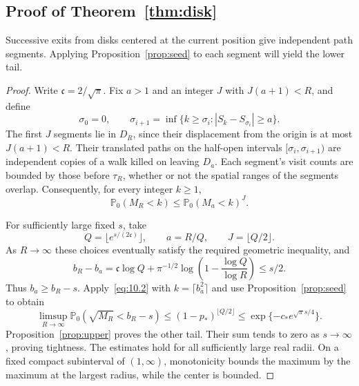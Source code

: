 \documentclass[11pt,a4paper]{article}
\numberwithin{equation}{section}
\theoremstyle{remark}
\begin{document}
\subsection{Proof of Theorem~\ref{thm:disk}}
Successive exits from disks centered at the current position give independent path segments. Applying Proposition~\ref{prop:seed} to each segment will yield the lower tail.
\begin{proof}
Write $\mathfrak c=2/\sqrt\pi$. Fix $a>1$ and an integer $J$ with $J(a+1)<R$, and define
\begin{equation}\label{eq:10.1}
\sigma_0=0,\qquad
\sigma_{i+1}=\inf\{k\ge\sigma_i:|S_k-S_{\sigma_i}|\ge a\}.
\end{equation}
The first $J$ segments lie in $D_R$, since their displacement from the origin is at most $J(a+1)<R$. Their translated paths on the half-open intervals $[\sigma_i,\sigma_{i+1})$ are independent copies of a walk killed on leaving $D_a$. Each segment's visit counts are bounded by those before $\tau_R$, whether or not the spatial ranges of the segments overlap. Consequently, for every integer $k\ge1$,
\begin{equation}\label{eq:10.2}
\mathbb P_0(M_R<k)\le\mathbb P_0(M_a<k)^J.
\end{equation}

For sufficiently large fixed $s$, take
\begin{equation}\label{eq:10.3}
Q=\lfloor e^{s/(2\mathfrak c)}\rfloor,\qquad
a=R/Q,\qquad J=\lfloor Q/2\rfloor.
\end{equation}
As $R\to\infty$ these choices eventually satisfy the required geometric inequality, and
\begin{equation}\label{eq:10.4}
b_R-b_a=\mathfrak c\log Q+
\pi^{-1/2}\log\left(1-\frac{\log Q}{\log R}\right)\le s/2.
\end{equation}
Thus $b_a\ge b_R-s$. Apply~\eqref{eq:10.2} with $k=\lceil b_a^2\rceil$ and use Proposition~\ref{prop:seed} to obtain
\begin{equation}\label{eq:10.5}
\limsup_{R\to\infty}\mathbb P_0(\sqrt{M_R}<b_R-s)
\le(1-p_*)^{\lfloor Q/2\rfloor}
\le\exp\{-c_*e^{\sqrt\pi s/4}\}.
\end{equation}
Proposition~\ref{prop:upper} proves the other tail. Their sum tends to zero as $s\to\infty$, proving tightness. The estimates hold for all sufficiently large real radii. On a fixed compact subinterval of $(1,\infty)$, monotonicity bounds the maximum by the maximum at the largest radius, while the center is bounded.
\end{proof}
\end{document}
